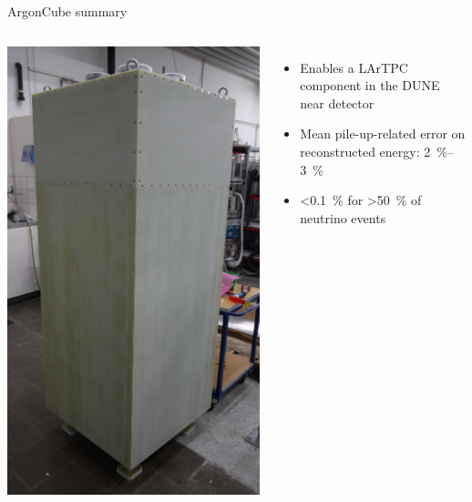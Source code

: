 \documentclass[]{beamer}
\newcommand*{\emphcol}{blue}
\newcommand*{\AC}{{ArgonCube}}
\newcommand*{\dune}{{DUNE}}
\newcommand*{\lartpc}{{LArTPC}}
\begin{document}
\begin{frame}{\AC{} summary}
	\begin{columns}[c]
		\centering
		\includegraphics[width=.8\textheight, angle=90]{ac/2x2/module_real}
		\begin{itemize}
			\item {\color{\emphcol} Enables a \lartpc{} component in the \dune{} near detector}
			\item Mean pile-up-related error on reconstructed energy: \SIrange{2}{3}{\percent}
			\item \SI{<0.1}{\percent} for \SI{>50}{\percent} of neutrino events
		\end{itemize}
	\end{columns}
\end{frame}
\end{document}
